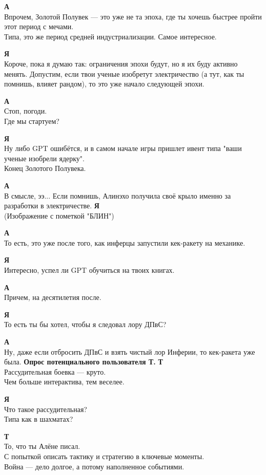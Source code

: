 \begin{tabbing}
\textbf{А} \\
Впрочем, Золотой Полувек — это уже не та эпоха, где ты хочешь быстрее пройти этот период с мечами. \\
Типа, это же период средней индустриализации. Самое интересное.

\textbf{Я} \\
Короче, пока я думаю так: ограничения эпохи будут, но я их буду активно менять. Допустим, если твои ученые изобретут электричество (а тут, как ты помнишь, влияет рандом), то это уже начало следующей эпохи.

\textbf{А} \\
Стоп, погоди. \\
Где мы стартуем?

\textbf{Я} \\
Ну либо GPT ошибётся, и в самом начале игры пришлет ивент типа "ваши ученые изобрели ядерку". \\
Конец Золотого Полувека.

\textbf{А} \\
В смысле, ээ... Если помнишь, Алинэхо получила своё крыло именно за разработки в электричестве.
\textbf{Я} \\
(Изображение с пометкой "БЛИН")

\textbf{А} \\
То есть, это уже после того, как инферцы запустили кек-ракету на механике.

\textbf{Я} \\
Интересно, успел ли GPT обучиться на твоих книгах.

\textbf{А} \\
Причем, на десятилетия после.

\textbf{Я} \\
То есть ты бы хотел, чтобы я следовал лору ДПвС?

\textbf{А} \\
Ну, даже если отбросить ДПвС и взять чистый лор Инферии, то кек-ракета уже была.
\textbf{Опрос потенциального пользователя Т.}
\textbf{Т} \\
Рассудительная боевка — круто. \\
Чем больше интерактива, тем веселее.

\textbf{Я} \\
Что такое рассудительная? \\
Типа как в шахматах?

\textbf{Т} \\
То, что ты Алёне писал. \\
С попыткой описать тактику и стратегию в ключевые моменты. \\
Война — дело долгое, а потому наполненное событиями.


\end{tabbing}
